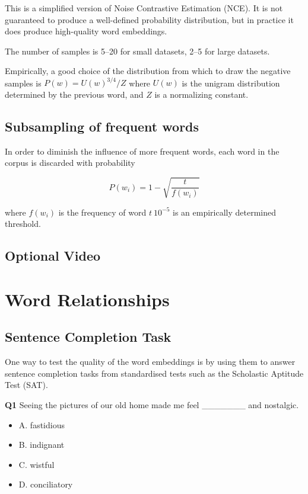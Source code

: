 \documentclass[11pt]{article}
\begin{document}
This is a simplified version of Noise Contrastive Estimation (NCE).
It is not guaranteed to produce a well-defined probability distribution, but in
practice it does produce high-quality word embeddings.

The number of samples is 5--20 for small datasets, 2--5 for large datasets.

Empirically, a good choice of the distribution from which to draw the negative
samples is $P(w) = U(w)^{3/4} / Z$ where $U(w)$ is the unigram distribution
determined by the previous word, and $Z$ is a normalizing constant.

\subsection{Subsampling of frequent words}\label{subsec:subsampling-of-frequent-words}
In order to diminish the influence of more frequent words, each word in the
corpus is discarded with probability

\[P(w_i) = 1 - \sqrt{\dfrac{t}{f(w_i)}}\]

where $f(w_i)$ is the frequency of word $t ~ 10^{-5}$ is an empirically
determined threshold.

\subsection{Optional Video}\label{subsec:optional-video3}

\section{Word Relationships}\label{sec:word-relationships}
\subsection{Sentence Completion Task}\label{subsec:sentence-completion-task}

One way to test the quality of the word embeddings is by using them to answer
sentence completion tasks from standardised tests such as the Scholastic
Aptitude Test (SAT).

\textbf{Q1}
Seeing the pictures of our old home made me feel \_______ and nostalgic.

\begin{itemize}
  \item A. fastidious
  \item B. indignant
  \item C. wistful
  \item D. conciliatory
\end{itemize}
\end{document}
